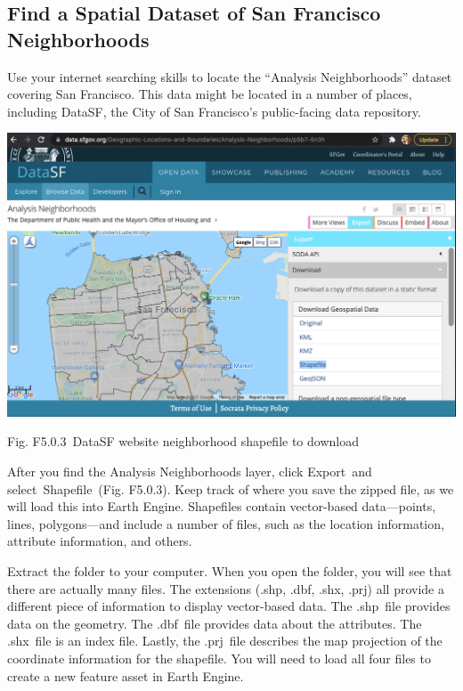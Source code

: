 \documentclass[
  letterpaper,
  DIV=11,
  numbers=noendperiod]{scrreprt}
\begin{document}
\hypertarget{find-a-spatial-dataset-of-san-francisco-neighborhoods}{%
\subsection{Find a Spatial Dataset of San Francisco
Neighborhoods}\label{find-a-spatial-dataset-of-san-francisco-neighborhoods}}

Use your internet searching skills to locate the ``Analysis
Neighborhoods'' dataset covering San Francisco. This data might be
located in a number of places, including DataSF, the City of San
Francisco's public-facing data repository.

\includegraphics{./F5/image27.png}

Fig. F5.0.3~DataSF website neighborhood shapefile to download

After you find the Analysis Neighborhoods layer, click Export~and
select~Shapefile~(Fig. F5.0.3). Keep track of where you save the zipped
file, as we will load this into Earth Engine. Shapefiles contain
vector-based data---points, lines, polygons---and include a number of
files, such as the location information, attribute information, and
others.

Extract the folder to your computer. When you open the folder, you will
see that there are actually many files. The extensions (.shp, .dbf,
.shx, .prj) all provide a different piece of information to display
vector-based data. The .shp~file provides data on the geometry. The
.dbf~file provides data about the attributes. The .shx~file is an index
file. Lastly, the .prj~file describes the map projection of the
coordinate information for the shapefile. You will need to load all four
files to create a new feature asset in Earth Engine.
\end{document}
